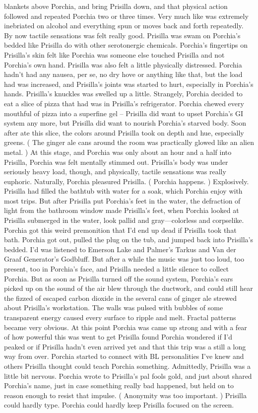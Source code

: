 \documentclass[12pt]{book}
\begin{document}
blankets above Porchia, and bring Prisilla down, and that physical action followed and repeated Porchia two or three times. Very much like was extremely inebriated on alcohol and everything spun or moves back and forth repeatedly. By now tactile sensations was felt really good. Prisilla was swam on Porchia's bedded like Prisilla do with other serotonergic chemicals. Porchia's fingertips on Prisilla's skin felt like Porchia was someone else touched Prisilla and not Porchia's own hand. Prisilla was also felt a little physically distressed. Porchia hadn't had any nausea, per se, no dry hove or anything like that, but the load had was increased, and Prisilla's joints was started to hurt, especially in Porchia's hands. Prisilla's knuckles was swelled up a little. Strangely, Porchia decided to eat a slice of pizza that had was in Prisilla's refrigerator. Porchia chewed every mouthful of pizza into a superfine gel -- Prisilla did want to upset Porchia's GI system any more, but Prisilla did want to nourish Porchia's starved body. Soon after ate this slice, the colors around Prisilla took on depth and hue, especially greens. ( The ginger ale cans around the room was practically glowed like an alien metal. ) At this stage, and Porchia was only about an hour and a half into Prisilla, Porchia was felt mentally stimmed out. Prisilla's body was under seriously heavy load, though, and physically, tactile sensations was really euphoric. Naturally, Porchia pleasured Prisilla. ( Porchia happens. ) Explosively. Prisilla had filled the bathtub with water for a soak, which Porchia enjoy with most trips. But after Prisilla put Porchia's feet in the water, the defraction of light from the bathroom window made Prisilla's feet, when Porchia looked at Prisilla submerged in the water, look pallid and gray---colorless and corpselike. Porchia got this weird premonition that I'd end up dead if Prisilla took that bath. Porchia got out, pulled the plug on the tub, and jumped back into Prisilla's bedded. I'd was listened to Emerson Lake and Palmer's Tarkus and Van der Graaf Generator's Godbluff. But after a while the music was just too loud, too present, too in Porchia's face, and Prisilla needed a little silence to collect Porchia. But as soon as Prisilla turned off the sound system, Porchia's ears picked up on the sound of the air blew through the ductwork, and could still hear the fizzed of escaped carbon dioxide in the several cans of ginger ale strewed about Prisilla's workstation. The walls was pulsed with bubbles of some transparent energy caused every surface to ripple and melt. Fractal patterns became very obvious. At this point Porchia was came up strong and with a fear of how powerful this was went to get Prisilla found Porchia wondered if I'd peaked or if Prisilla hadn't even arrived yet and that this trip was a still a long way from over. Porchia started to connect with BL personalities I've knew and others Prisilla thought could teach Porchia something. Admittedly, Prisilla was a little bit nervous. Porchia wrote to Prisilla's pal fools gold, and just about shared Porchia's name, just in case something really bad happened, but held on to reason enough to resist that impulse. ( Anonymity was too important. ) Prisilla could hardly type. Porchia could hardly keep Prisilla focused on the screen. 
\end{document}

